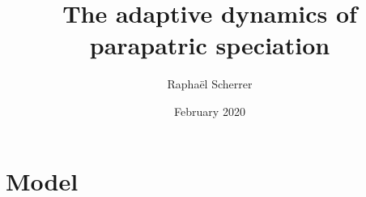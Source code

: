 \documentclass{article}
\title{The adaptive dynamics of parapatric speciation}
\author{Raphaël Scherrer}
\date{February 2020}
\begin{document}
\maketitle

\section{Model}


\end{document}
